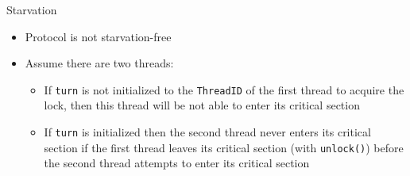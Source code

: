 \begin{frame}{Starvation}
  \begin{itemize}
  \item Protocol is not starvation-free
  \item Assume there are two threads:
    \begin{itemize}
    \item If \lstinline!turn! is not initialized to the
      \lstinline!ThreadID! of the first thread to acquire the lock,
      then this thread will be not able to enter its critical section
    \item If \lstinline!turn! is initialized then the second thread
      never enters its critical section if the first thread leaves its
      critical section (with \lstinline!unlock()!) before the second
      thread attempts to enter its critical section
    \end{itemize}
  \end{itemize}
\end{frame}

